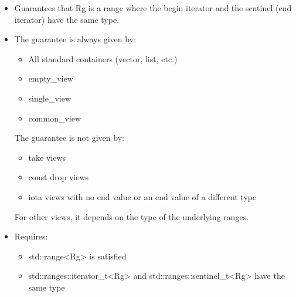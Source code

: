 
\begin{itemize}
\item
Guarantees that Rg is a range where the begin iterator and the sentinel (end iterator) have the same type.

\item
The guarantee is always given by:

\begin{itemize}
\item
All standard containers (vector, list, etc.)

\item
empty\_view

\item
single\_view

\item
common\_view
\end{itemize}

The guarantee is not given by:

\begin{itemize}
\item
take views

\item
const drop views

\item
iota views with no end value or an end value of a different type
\end{itemize}

For other views, it depends on the type of the underlying ranges.

\item
Requires:

\begin{itemize}
\item
std::range<Rg> is satisfied

\item
std::ranges::iterator\_t<Rg> and std::ranges::sentinel\_t<Rg> have the same type
\end{itemize}
\end{itemize}


